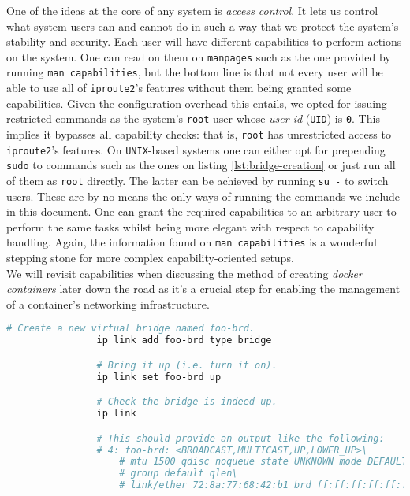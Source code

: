                 One of the ideas at the core of any system is \textit{access control}. It lets us control what system users can and cannot do in such a way that we protect the system's stability and security. Each user will have different capabilities to perform actions on the system. One can read on them on \texttt{manpages} such as the one provided by running \texttt{man capabilities}, but the bottom line is that not every user will be able to use all of \texttt{iproute2}'s features without them being granted some capabilities. Given the configuration overhead this entails, we opted for issuing restricted commands as the system's \texttt{root} user whose \textit{user id} (\texttt{UID}) is \texttt{0}. This implies it bypasses all capability checks: that is, \texttt{root} has unrestricted access to \texttt{iproute2}'s features. On \texttt{UNIX}-based systems one can either opt for prepending \texttt{sudo} to commands such as the ones on listing \ref{lst:bridge-creation} or just run all of them as \texttt{root} directly. The latter can be achieved by running \texttt{su -} to switch users. These are by no means the only ways of running the commands we include in this document. One can grant the required capabilities to an arbitrary user to perform the same tasks whilst being more elegant with respect to capability handling. Again, the information found on \texttt{man capabilities} is a wonderful stepping stone for more complex capability-oriented setups.\\

                We will revisit capabilities when discussing the method of creating \textit{docker containers} later down the road as it's a crucial step for enabling the management of a container's networking infrastructure.\\

            \begin{lstlisting}[language = bash, caption = Instantiating a Virtual Network Bridge., label = lst:bridge-creation]
                # Create a new virtual bridge named foo-brd.
                ip link add foo-brd type bridge

                # Bring it up (i.e. turn it on).
                ip link set foo-brd up

                # Check the bridge is indeed up.
                ip link

                # This should provide an output like the following:
                # 4: foo-brd: <BROADCAST,MULTICAST,UP,LOWER_UP>\
                    # mtu 1500 qdisc noqueue state UNKNOWN mode DEFAULT
                    # group default qlen\
                    # link/ether 72:8a:77:68:42:b1 brd ff:ff:ff:ff:ff:ff
            \end{lstlisting}

